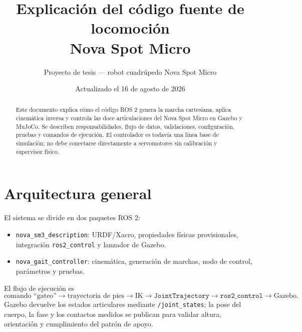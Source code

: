 \documentclass[11pt,a4paper]{article}
\title{Explicación del código fuente de locomoción\\Nova Spot Micro}
\author{Proyecto de tesis --- robot cuadrúpedo Nova Spot Micro}
\date{Actualizado el 16 de agosto de 2026}
\begin{document}
\maketitle
\begin{abstract}
Este documento explica cómo el código ROS 2 genera la marcha cartesiana, aplica
cinemática inversa y controla las doce articulaciones del Nova Spot Micro en
Gazebo y MuJoCo. Se describen responsabilidades, flujo de datos, validaciones,
configuración, pruebas y comandos de ejecución. El controlador es todavía una
línea base de simulación; no debe conectarse directamente a servomotores sin
calibración y supervisor físico.
\end{abstract}
\tableofcontents

\section{Arquitectura general}
El sistema se divide en dos paquetes ROS 2:
\begin{itemize}
\item \texttt{nova\_sm3\_description}: URDF/Xacro, propiedades físicas
  provisionales, integración \texttt{ros2\_control} y lanzador de Gazebo.
\item \texttt{nova\_gait\_controller}: cinemática, generación de marchas,
  nodo de control, parámetros y pruebas.
\end{itemize}

El flujo de ejecución es
\[
\text{comando ``gateo''}\rightarrow
\text{trayectoria de pies}\rightarrow
\text{IK}\rightarrow
\texttt{JointTrajectory}\rightarrow
\texttt{ros2\_control}\rightarrow\text{Gazebo}.
\]
Gazebo devuelve los estados articulares mediante \texttt{/joint\_states}; la
pose del cuerpo, la fase y los contactos medidos se publican para validar
altura, orientación y cumplimiento del patrón de apoyo.
\end{document}
